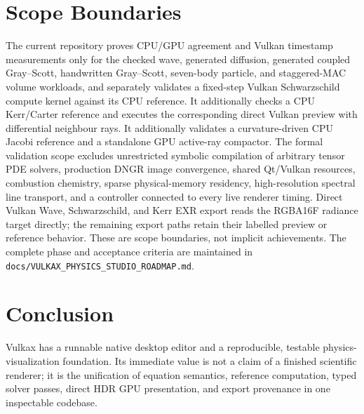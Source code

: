 \documentclass[10pt]{article}
\begin{document}
\section{Scope Boundaries}

The current repository proves CPU/GPU agreement and Vulkan timestamp measurements only for the
checked wave, generated diffusion, generated coupled Gray--Scott, handwritten Gray--Scott,
seven-body particle, and staggered-MAC volume workloads, and separately validates a
fixed-step Vulkan Schwarzschild compute kernel against its CPU reference. It additionally checks a
CPU Kerr/Carter reference and executes the corresponding direct Vulkan preview with differential
neighbour rays. It additionally validates a curvature-driven CPU Jacobi reference and a standalone
GPU active-ray compactor. The formal validation scope excludes unrestricted symbolic compilation
of arbitrary tensor PDE solvers, production DNGR image convergence, shared Qt/Vulkan resources,
combustion chemistry, sparse physical-memory residency, high-resolution spectral line transport,
and a controller connected to every live renderer timing. Direct
Vulkan Wave, Schwarzschild, and Kerr EXR export reads the RGBA16F radiance target directly; the
remaining export paths retain their labelled preview or
reference behavior. These are scope boundaries, not implicit achievements.
The complete phase and acceptance criteria are maintained in
\texttt{docs/VULKAX\_PHYSICS\_STUDIO\_ROADMAP.md}.

\section{Conclusion}

Vulkax has a runnable native desktop editor and a reproducible, testable physics-visualization
foundation. Its immediate value is not a claim of a finished scientific renderer; it is the
unification of equation semantics, reference computation, typed solver passes, direct HDR GPU
presentation, and export provenance in one inspectable codebase.
\end{document}
